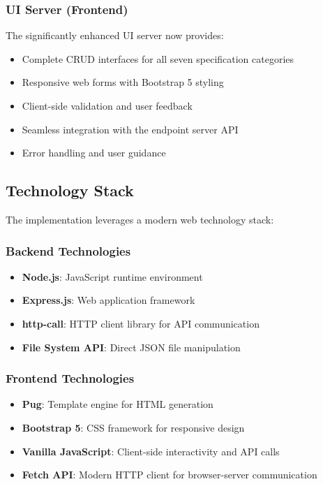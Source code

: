 \documentclass[11pt,a4paper]{article}
\begin{document}
\subsubsection{UI Server (Frontend)}
The significantly enhanced UI server now provides:
\begin{itemize}
    \item Complete CRUD interfaces for all seven specification categories
    \item Responsive web forms with Bootstrap 5 styling
    \item Client-side validation and user feedback
    \item Seamless integration with the endpoint server API
    \item Error handling and user guidance
\end{itemize}

\subsection{Technology Stack}

The implementation leverages a modern web technology stack:

\subsubsection{Backend Technologies}
\begin{itemize}
    \item \textbf{Node.js}: JavaScript runtime environment
    \item \textbf{Express.js}: Web application framework
    \item \textbf{http-call}: HTTP client library for API communication
    \item \textbf{File System API}: Direct JSON file manipulation
\end{itemize}

\subsubsection{Frontend Technologies}
\begin{itemize}
    \item \textbf{Pug}: Template engine for HTML generation
    \item \textbf{Bootstrap 5}: CSS framework for responsive design
    \item \textbf{Vanilla JavaScript}: Client-side interactivity and API calls
    \item \textbf{Fetch API}: Modern HTTP client for browser-server communication
\end{itemize}
\end{document}
